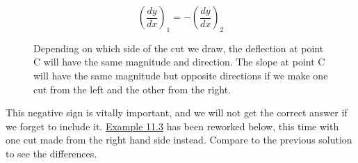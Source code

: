 \documentclass[
  letterpaper,
  DIV=11,
  numbers=noendperiod]{scrreprt}
\theoremstyle{definition}
\theoremstyle{remark}
\begin{document}
\[
\left(\frac{d y}{d x}\right)_{1}=-\left(\frac{d y}{d x}\right)_{2}
\]

\begin{figure}


\caption{\label{fig-11.5}Depending on which side of the cut we draw, the
deflection at point C will have the same magnitude and direction. The
slope at point C will have the same magnitude but opposite directions if
we make one cut from the left and the other from the right.}

\end{figure}%

This negative sign is vitally important, and we will not get the correct
answer if we forget to include it. \hyperref[example-11.3b]{Example
11.3} has been reworked below, this time with one cut made from the
right hand side instead. Compare to the previous solution to see the
differences.
\end{document}
